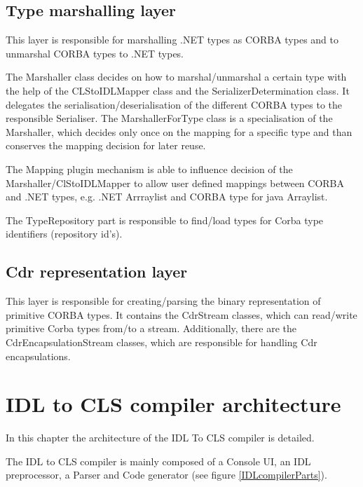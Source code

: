 \documentclass[a4paper]{report}
\begin{document}
\subsection{Type marshalling layer}
This layer is responsible for marshalling .NET types as CORBA types and to unmarshal CORBA types to .NET types.

The Marshaller class decides on how to marshal/unmarshal a certain type with the help of the CLStoIDLMapper class and
the SerializerDetermination class. It delegates the serialisation/deserialisation of the different CORBA types 
to the responsible Serialiser.
The MarshallerForType class is a specialisation of the Marshaller, which decides only once
on the mapping for a specific type and than conserves the mapping decision for later reuse.

The Mapping plugin mechanism is able to influence decision of the Marshaller/ClStoIDLMapper to
allow user defined mappings between CORBA and .NET types, e.g. .NET Arrraylist and 
CORBA type for java Arraylist.

The TypeRepository part is responsible to find/load types for Corba type identifiers (repository id's).


\subsection{Cdr representation layer}
This layer is responsible for creating/parsing the binary representation of primitive CORBA types.
It contains the CdrStream classes, which can read/write primitive Corba types from/to a stream.
Additionally, there are the CdrEncapsulationStream classes, which are responsible for handling 
Cdr encapsulations.

\newpage
\section{IDL to CLS compiler architecture}
In this chapter the architecture of the IDL To CLS compiler is detailed.

The IDL to CLS compiler is mainly composed of a Console UI, an IDL preprocessor, a Parser and Code generator 
(see figure \ref{IDLcompilerParts}).
\end{document}
